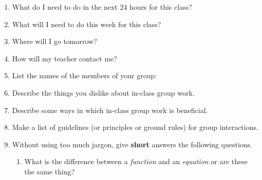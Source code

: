 \documentclass[11pt,fleqn]{article}
\begin{document}
\begin{enumerate}
\item What do I need to do in the next 24 hours for this class?\\
\vfill
\item What will I need to do this week for this class?\\
\vfill
\item Where will I go tomorrow?
\vfill
\item How will my teacher contact me? \\
\vfill
\newpage
\item List the names of the members of your group:
\vfill
\item Describe the things you dislike about in-class group work.
\vfill
\item Describe some ways in which in-class group work is beneficial.
\vfill
\item Make a list of guidelines (or principles or ground rules) for group interactions. 
\vfill
\newpage
\item Without using too much jargon, give \textbf{short} answers the following questions.
	\begin{enumerate}
	\item  What is the difference between a \emph{function} and an \emph{equation} or are these the same thing?\\
	

\end{enumerate}
\end{enumerate}
\end{document}
